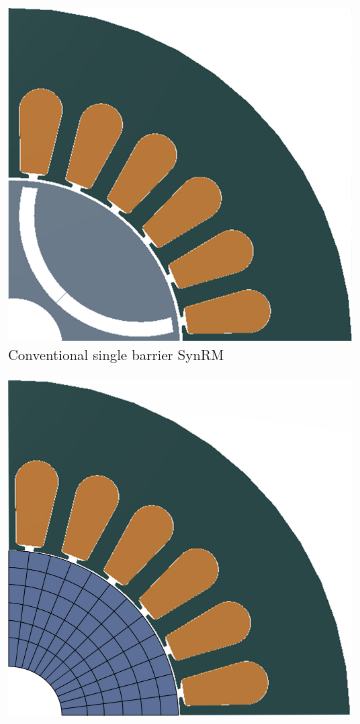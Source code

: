 \begin{figure}[h!]
    \centering
    \begin{subfigure}{0.3\textwidth}
        \centering
        \includegraphics[width=\linewidth]{Figures/Ch_MDP/SynRM_dual_conventional_small.png}
        \caption{Conventional single barrier SynRM}
        \label{subfig:MDP_SynRM_dual_conventional}
    \end{subfigure}
    \begin{subfigure}{0.3\textwidth}
        \centering
        \includegraphics[width=\linewidth]{Figures/Ch_MDP/SynRM_dual_blank2_small.png}

\end{subfigure}
\end{figure}
